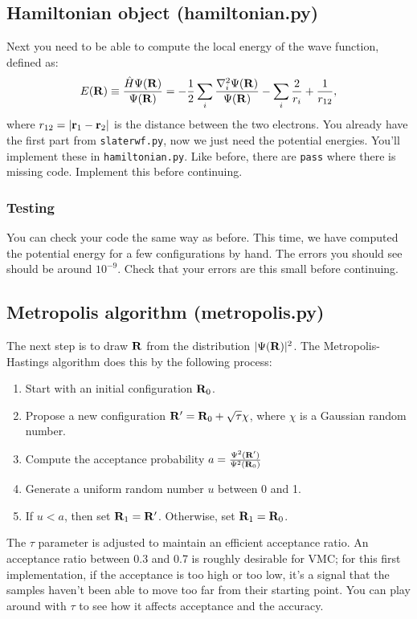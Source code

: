 \documentclass[12pt]{article}
\newcommand{\bR}{{\bf R}}
\newcommand{\br}{{\bf r}}
\begin{document}
\subsection{Hamiltonian object (hamiltonian.py)}

Next you need to be able to compute the local energy of the wave function, defined as:
\begin{equation}
E(\bR)
\equiv
\frac{\hat{H}\Psi(\bR)}{\Psi(\bR) } = -\frac{1}{2} \sum_i \frac{\nabla_i^2 \Psi(\bR)}{\Psi(\bR)} - \sum_i \frac{2}{r_i} + \frac{1}{r_{12}},
\end{equation}
where $r_{12}=|\br_1-\br_2|$ is the distance between the two electrons.
You already have the first part from \verb|slaterwf.py|, now we just need the potential energies. 
You'll implement these in \verb|hamiltonian.py|. 
Like before, there are \verb|pass| where there is missing code. 
Implement this before continuing. 

\subsubsection{Testing}

You can check your code the same way as before.
This time, we have computed the potential energy for a few configurations by hand. 
The errors you should see should be around $10^{-9}$.
Check that your errors are this small before continuing.

\subsection{Metropolis algorithm (metropolis.py)}

The next step is to draw $\bR$ from the distribution $|\Psi(\bR)|^2$. 
The Metropolis-Hastings algorithm does this by the following process:
\begin{enumerate}
\item Start with an initial configuration $\bR_0$. 	
\item Propose a new configuration $\bR'=\bR_0 + \sqrt{\tau} \chi$, where $\chi$ is a Gaussian random number.
\item Compute the acceptance probability $a=\frac{\Psi^2(\bR')}{\Psi^2(\bR_0)}$
\item Generate a uniform random number $u$ between 0 and 1. 
\item If $u < a$, then set $\bR_1=\bR'$. Otherwise, set $\bR_1=\bR_0$.
\end{enumerate}

The $\tau$ parameter is adjusted to maintain an efficient acceptance ratio. 
An acceptance ratio between 0.3 and 0.7 is roughly desirable for VMC; for this first implementation, if the acceptance is too high or too low, it's a signal that the samples haven't been able to move too far from their starting point.
You can play around with $\tau$ to see how it affects acceptance and the accuracy.
\end{document}
